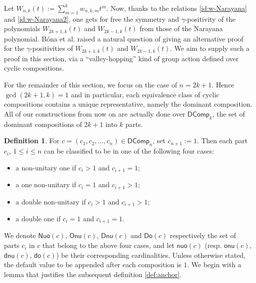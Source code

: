 \documentclass[reqno]{amsart}
\numberwithin{equation}{section}
\theoremstyle{definition}
\newtheorem{definition}{Definition}[section]
\theoremstyle{named}
\def\DComp{\mathsf{DComp}}
\def\Nuo{\mathsf{Nuo}}
\def\Onu{\mathsf{Onu}}
\def\Dnu{\mathsf{Dnu}}
\def\Do{\mathsf{Do}}
\def\nuo{\mathsf{nuo}}
\def\onu{\mathsf{onu}}
\def\dnu{\mathsf{dnu}}
\newcommand{\sdo}{\mathsf{do}}
\begin{document}
Let $W_{n,k}(t):=\sum_{m=1}^k w_{n,k,m}t^m$. Now, thanks to the relations \eqref{id:w-Narayana} and \eqref{id:w-Narayana2}, one gets for free the symmetry and $\gamma$-positivity of the polynomials $W_{2k+1,k}(t)$ and $W_{2k-1,k}(t)$ from those of the Narayana polynomial. B\'ona et al. \cite[Remark 6.10]{BDL2022} raised a natural question of giving an alternative proof for the $\gamma$-positivities of $W_{2k+1,k}(t)$ and $W_{2k-1,k}(t)$. We aim to supply such a proof in this section, via a ``valley-hopping'' kind of group action defined over cyclic compositions. 

For the remainder of this section, we focus on the case of $n=2k+1$. Hence $\gcd(2k+1,k)=1$ and in particular, each equivalence class of cyclic compositions contains a unique representative, namely the dominant composition. All of our constructions from now on are actually done over $\DComp_k$, the set of dominant compositions of $2k+1$ into $k$ parts.



\begin{definition}
For $c=\left(c_1, c_2, \ldots, c_n\right) \in \DComp_n$, set $c_{n+1}:=1$. Then each part $c_i$, $1\le i\le n$ can be classified to be in one of the following four cases:
\begin{itemize}
	\item a non-unitary one if $c_i >1$ and $c_{i+1}=1$;
	\item a one non-unitary if $c_i =1$ and $c_{i+1}>1$;
	\item a double non-unitary if $c_i >1$ and $c_{i+1}>1$;
	\item a double one if $c_i =1$ and $c_{i+1}=1$.
\end{itemize}
\end{definition}
We denote $\Nuo(c)$, $\Onu(c)$, $\Dnu(c)$ and $\Do(c)$
respectively the set of parts $c_i$ in $c$ that belong to the above four cases, and let $\nuo(c)$ (resp. $\onu(c)$, $\dnu(c)$, $\sdo(c)$) be their corresponding cardinalities. Unless otherwise stated, the default value to be appended after each composition is $1$. We begin with a lemma that justifies the subsequent definition \ref{def:anchor}.
\end{document}
